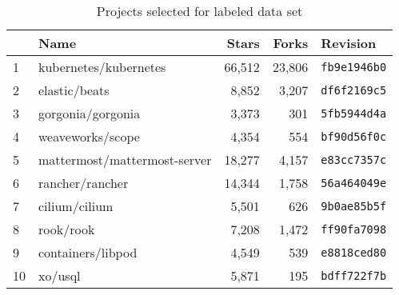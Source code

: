 \begin{table}[!t]
\vspace{2mm}

    \centering
    \caption{Projects selected for labeled data set}
    \label{tbl:dataset-projects}
    \begin{adjustbox}{max width=\textwidth}
    \begin{tabular}{llrrl}
        {} & \textbf{Name} &  \textbf{Stars} &  \textbf{Forks} &    \textbf{Revision} \\ \hline
        \rowcolor{verylightgray}
        1  &         kubernetes/kubernetes &  66,512 &  23,806 &  \texttt{fb9e1946b0} \\
        2  &                 elastic/beats &   8,852 &   3,207 &  \texttt{df6f2169c5} \\
        \rowcolor{verylightgray}
        3  &             gorgonia/gorgonia &   3,373 &    301 &  \texttt{5fb5944d4a} \\
        4  &              weaveworks/scope &   4,354 &    554 &  \texttt{bf90d56f0c} \\
        \rowcolor{verylightgray}
        5  &  mattermost/mattermost-server &  18,277 &   4,157 &  \texttt{e83cc7357c} \\
        6  &               rancher/rancher &  14,344 &   1,758 &  \texttt{56a464049e} \\
        \rowcolor{verylightgray}
        7  &                 cilium/cilium &   5,501 &    626 &  \texttt{9b0ae85b5f} \\
        8  &                     rook/rook &   7,208 &   1,472 &  \texttt{ff90fa7098} \\
        \rowcolor{verylightgray}
        9  &             containers/libpod &   4,549 &    539 &  \texttt{e8818ced80} \\
        10 &                       xo/usql &   5,871 &    195 &  \texttt{bdff722f7b} \\ %
    \end{tabular}
    \end{adjustbox}
    \vspace{-10pt}
\end{table}